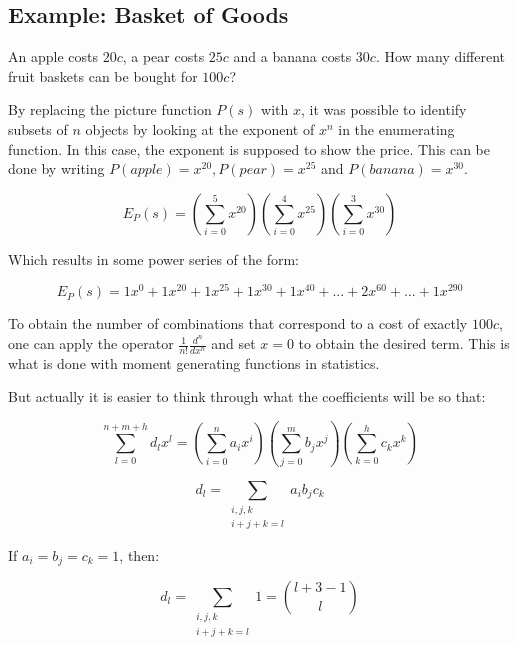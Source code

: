 \subsection{Example: Basket of Goods}

An apple costs $20c$, a pear costs $25c$ and a banana costs $30c$. How many different fruit baskets can be bought for $100c$?

By replacing the picture function $P(s)$ with $x$, it was possible to identify subsets of $n$ objects by looking at the exponent of $x^n$ in the enumerating function. In this case, the exponent is supposed to show the price. This can be done by writing $P(apple) = x^{20}, P(pear) = x^{25}$ and $P(banana) = x^{30}$. 

\begin{equation}
E_P(s) = \left( \sum_{i=0}^5 x^{20} \right)\left( \sum_{i=0}^4 x^{25} \right)\left( \sum_{i=0}^3 x^{30} \right)
\end{equation}

Which results in some power series of the form:

\begin{equation}
E_P(s) = 1x^0 + 1x^{20} + 1x^{25} + 1x^{30} + 1x^{40} +... + 2x^{60} + ... + 1x^{290}
\end{equation}

To obtain the number of combinations that correspond to a cost of exactly $100c$, one can apply the operator $\frac{1}{n!}\frac{d^n}{dx^n}$ and set $x=0$ to obtain the desired term. This is what is done with moment generating functions in statistics. 

But actually it is easier to think through what the coefficients will be so that:

\begin{equation}
\sum_{l=0}^{n+m+h}d_l x^l = \left(\sum_{i=0}^n a_i x^i\right)\left(\sum_{j=0}^m b_j x^j\right)\left(\sum_{k=0}^h c_k x^k\right)
\end{equation}

\begin{equation}
d_l = \sum_{\begin{array}{c}i,j,k\\i+j+k=l\end{array}} a_i b_j c_k
\end{equation}

If $a_i = b_j = c_k = 1$, then:

\begin{equation}
d_l = \sum_{\begin{array}{c}i,j,k\\i+j+k=l\end{array}} 1 = {l + 3 - 1 \choose l}
\end{equation}

